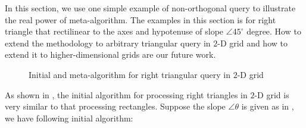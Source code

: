 

In this section, we use one simple example of non-orthogonal query to
illustrate the real power of meta-algorithm. The examples in this section
is for right triangle that rectilinear to the axes and hypotenuse of slope
$\angle 45^{\circ}$ degree.  How to extend the methodology to arbitrary
triangular query in $2$-D grid and how to extend it to higher-dimensional
grids are our future work.


\begin{figure}[!ht]
\centering
{}
\hfill
\caption{Initial and meta-algorithm for right triangular query in $2$-D grid}
\label{fig:right-triangle}
\end{figure}


As shown in , the initial algorithm
for processing right triangles in $2$-D grid is very similar to that
processing rectangles.  Suppose the slope $\angle\theta$ is given as in
, we have following initial algorithm:

